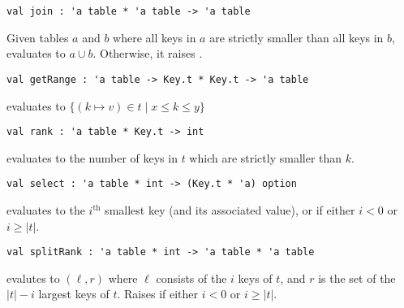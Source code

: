 \begin{gram}[join]
\begin{verbatim}
val join : 'a table * 'a table -> 'a table
\end{verbatim}
Given tables $a$ and $b$ where all keys in $a$ are strictly smaller than all
keys in $b$,  evaluates to $a \cup b$. Otherwise, it raises
.
\end{gram}

\begin{gram}[getRange]
\begin{verbatim}
val getRange : 'a table -> Key.t * Key.t -> 'a table
\end{verbatim}
 evaluates to $\{(k \mapsto v) \in t \mathbin| x \leq k \leq y\}$
\end{gram}

\begin{gram}[rank]
\begin{verbatim}
val rank : 'a table * Key.t -> int
\end{verbatim}
 evaluates to the number of keys in $t$ which are strictly
smaller than $k$.
\end{gram}

\begin{gram}[select]
\begin{verbatim}
val select : 'a table * int -> (Key.t * 'a) option
\end{verbatim}
 evaluates to the $i^\text{th}$ smallest key (and its
associated value), or  if either $i < 0$ or $i \geq |t|$.
\end{gram}

\begin{gram}[splitRank]
\begin{verbatim}
val splitRank : 'a table * int -> 'a table * 'a table
\end{verbatim}
 evalutes to $(\ell,r)$ where $\ell$ consists of the $i$
keys of $t$, and $r$ is the set of the $|t|-i$ largest
keys of $t$. Raises  if either $i < 0$ or $i \geq |t|$.
\end{gram}

